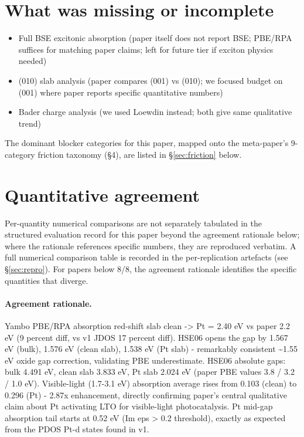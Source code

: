 \documentclass[11pt]{article}
\begin{document}
\section{What was missing or incomplete}
\begin{itemize}
\item Full BSE excitonic absorption (paper itself does not report BSE; PBE/RPA suffices for matching paper claims; left for future tier if exciton physics needed)
\item (010) slab analysis (paper compares (001) vs (010); we focused budget on (001) where paper reports specific quantitative numbers)
\item Bader charge analysis (we used Loewdin instead; both give same qualitative trend)
\end{itemize}
The dominant blocker categories for this paper, mapped onto the meta-paper's 9-category friction taxonomy (\S4), are listed in \S\ref{sec:friction} below.

\section{Quantitative agreement}
Per-quantity numerical comparisons are not separately tabulated in the structured evaluation record for this paper beyond the agreement rationale below; where the rationale references specific numbers, they are reproduced verbatim. A full numerical comparison table is recorded in the per-replication artefacts (see \S\ref{sec:repro}). For papers below 8/8, the agreement rationale identifies the specific quantities that diverge.

\paragraph{Agreement rationale.} Yambo PBE/RPA absorption red-shift slab clean -\textgreater{} Pt = 2.40 eV vs paper 2.2 eV (9 percent diff, vs v1 JDOS 17 percent diff). HSE06 opens the gap by 1.567 eV (bulk), 1.576 eV (clean slab), 1.538 eV (Pt slab) - remarkably consistent \textasciitilde{}1.55 eV oxide gap correction, validating PBE underestimate. HSE06 absolute gaps: bulk 4.491 eV, clean slab 3.833 eV, Pt slab 2.024 eV (paper PBE values 3.8 / 3.2 / 1.0 eV). Visible-light (1.7-3.1 eV) absorption average rises from 0.103 (clean) to 0.296 (Pt) - 2.87x enhancement, directly confirming paper's central qualitative claim about Pt activating LTO for visible-light photocatalysis. Pt mid-gap absorption tail starts at 0.52 eV (Im eps \textgreater{} 0.2 threshold), exactly as expected from the PDOS Pt-d states found in v1.
\end{document}
